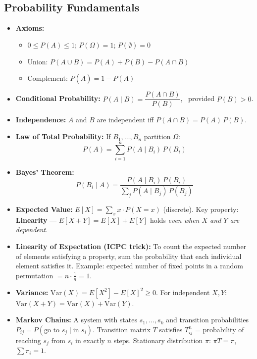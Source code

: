 \subsection{Probability Fundamentals}

\begin{itemize}
    \item \textbf{Axioms:}
          \begin{itemize}
              \item $0 \leq P(A) \leq 1$; $P(\Omega) = 1$; $P(\emptyset) = 0$
              \item Union: $P(A \cup B) = P(A) + P(B) - P(A \cap B)$
              \item Complement: $P(\bar{A}) = 1 - P(A)$
          \end{itemize}

    \item \textbf{Conditional Probability:}
          $P(A \mid B) = \dfrac{P(A \cap B)}{P(B)}$, \ provided $P(B) > 0$.

    \item \textbf{Independence:} $A$ and $B$ are independent iff $P(A \cap B) = P(A)\,P(B)$.

    \item \textbf{Law of Total Probability:} If $B_1, \ldots, B_n$ partition $\Omega$:
          \[ P(A) = \sum_{i=1}^{n} P(A \mid B_i)\,P(B_i) \]

    \item \textbf{Bayes' Theorem:}
          \[ P(B_i \mid A) = \frac{P(A \mid B_i)\,P(B_i)}{\sum_{j} P(A \mid B_j)\,P(B_j)} \]

    \item \textbf{Expected Value:}
          $E[X] = \sum_{x} x \cdot P(X = x)$ (discrete).
          Key property: \textbf{Linearity} — $E[X + Y] = E[X] + E[Y]$ holds \textit{even when $X$ and $Y$ are dependent}.

    \item \textbf{Linearity of Expectation (ICPC trick):} To count the expected number of elements satisfying a property, sum the probability that each individual element satisfies it. Example: expected number of fixed points in a random permutation $= n \cdot \frac{1}{n} = 1$.

    \item \textbf{Variance:} $\text{Var}(X) = E[X^2] - E[X]^2 \geq 0$.
          For independent $X, Y$: $\text{Var}(X + Y) = \text{Var}(X) + \text{Var}(Y)$.

    \item \textbf{Markov Chains:} A system with states $s_1, \ldots, s_k$ and transition probabilities $P_{ij} = P(\text{go to } s_j \mid \text{in } s_i)$. Transition matrix $T$ satisfies $T^n_{ij}$ = probability of reaching $s_j$ from $s_i$ in exactly $n$ steps. Stationary distribution $\pi$: $\pi T = \pi$, $\sum \pi_i = 1$.
\end{itemize}